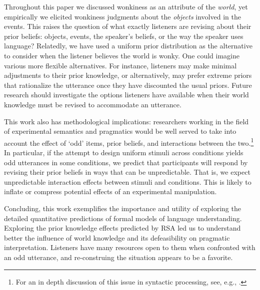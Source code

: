 \documentclass[10pt,letterpaper]{article}
\newcommand{\red}[1]{\textcolor{Red}{#1}}
\begin{document}
Throughout this paper we discussed wonkiness as an attribute of the \emph{world}, yet empirically we elicited wonkiness judgments about the \emph{objects} involved in the events. 
This raises the question of what exactly listeners are revising about their prior beliefs: objects, events, the speaker's beliefs, or the way the speaker uses language? 
Relatedly, we have used a uniform prior distribution as the alternative to consider when the listener believes the world is wonky.  One could imagine various more flexible alternatives. For instance, listeners may make minimal adjustments to their prior knowledge, or alternatively, may prefer extreme priors that rationalize the utterance once they have discounted the usual priors.
Future research should investigate the options listeners have available when their world knowledge must be revised to accommodate an utterance.

This work also has methodological implications: researchers working in the field of experimental semantics and pragmatics would be well served to take into account the effect of `odd' items, prior beliefs, and interactions between the two.\footnote{For an in depth discussion of this issue in syntactic processing, see, e.g., .} In particular, if the attempt to design uniform stimuli across conditions yields odd utterances in some conditions, we predict that participants will respond by revising their prior beliefs in ways that can be unpredictable. That is, we expect unpredictable interaction effects between stimuli and conditions. This is likely to inflate or compress potential effects of an experimental manipulation. 

Concluding, this work exemplifies the importance and utility of exploring the detailed quantitative predictions of formal models of language understanding.
Exploring the prior knowledge effects predicted by RSA led us to understand better the influence of world knowledge and its defeasibility on pragmatic interpretation.
Listeners have many resources open to them when confronted with an odd utterance, and re-construing the situation %
appears to be a favorite.
\end{document}
